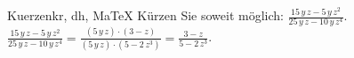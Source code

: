 \begin{MAufgabe}{Kuerzen}{kr, dh, MaTeX}
K\"urzen Sie soweit m\"oglich: $\frac{15\, y\, z - 5\, y\, z^2}{25\, y\, z - 10\, y\, z^4}$.\\ 
\ifLsg\MLoesung
\quad $\frac{15\, y\, z - 5\, y\, z^2}{25\, y\, z - 10\, y\, z^4}=\frac{(5\, y\, z)\cdot(3 - z)}{(5\, y\, z)\cdot(5 - 2\, z^3)}=\frac{3 - z}{5 - 2\, z^3}$.\else\relax\fi
 \end{MAufgabe}